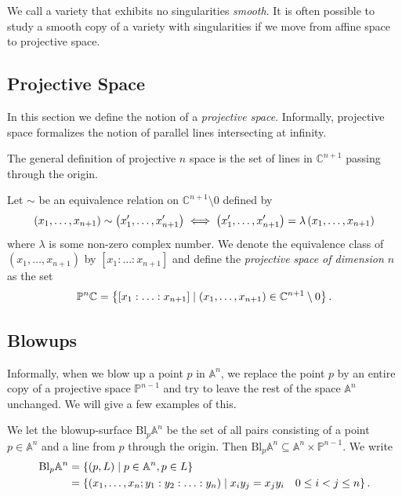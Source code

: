 \documentclass{article}
\newcommand{\C}{\mathbb{C}}
\newcommand{\A}{\mathbb{A}}
\newcommand{\Bu}[2]{\mathrm{Bl}_{#1}\A^{#2}}
\renewcommand{\P}{\mathbb{P}}
\begin{document}
We call a variety that exhibits no singularities \emph{smooth}.
It is often possible to study a smooth copy of a variety with singularities if
we move from affine space to projective space.

\subsection{Projective Space}
\label{sub:projective_space}

In this section we define the notion of a \emph{projective
space}.  Informally, projective space formalizes the
notion of parallel lines intersecting at infinity.

The general definition of projective $n$ space is the set of lines in
$\C^{n+1}$ passing through the origin.
\begin{definition}
    Let $\sim$ be an equivalence relation on $\C^{n+1} \setminus 0$ defined by
    \begin{equation}
        \notag
        \left( x_1, \ldots, x_{n+1} \right) \sim \left( x_1', \ldots,
        x_{n+1}' \right) \iff \left( x_1', \ldots, x_{n+1}' \right) =
        \lambda \left( x_1, \ldots, x_{n+1} \right)
    \end{equation}
    where $\lambda$ is some non-zero complex number. We denote the equivalence
    class of $\left( x_1, \ldots, x_{n+1} \right)$ by $\left[ x_1 : \ldots :
    x_{n+1} \right]$ and define the \emph{projective space of dimension $n$} as
    the set
    \begin{equation}
        \notag
        \P^n{\C} = \left\{ \left[ x_1 : \ldots : x_{n+1} \right] \mid
        \left( x_1, \ldots, x_{n+1} \right) \in \C^{n+1} \setminus
        0 \right\}.
    \end{equation}
\end{definition}
\subsection{Blowups}
\label{sub:blowups}

Informally, when we blow up a point $p$ in $\A^n$, we replace the point $p$ by
an entire copy of a projective space $\P^{n-1}$ and try to leave the rest of
the space $\A^n$ unchanged. We will give a few examples of this.

\begin{definition}[Blowup of $\A^n$ at $p$]
    \label{defn:blowup_point}
    We let the blowup-surface $\Bu{p}{n}$ be the set of all
    pairs consisting of a point $p
    \in \A^n$ and a line from $p$ through the origin.  Then $\Bu{p}{n} \subseteq
   \A^n\times\P^{n-1}$. We write
   \begin{align*}
       \notag
       \Bu{p}{n} &= \left\{ (p, L) \mid p \in \A^n, p \in L \right\} \\
         &= \left\{ (x_1, \ldots, x_n ; y_1: y_2: \ldots :y_n) \mid x_iy_j =
           x_jy_i \quad 0 \leq i < j \leq n \right\}.
   \end{align*}
\end{definition}
\end{document}
